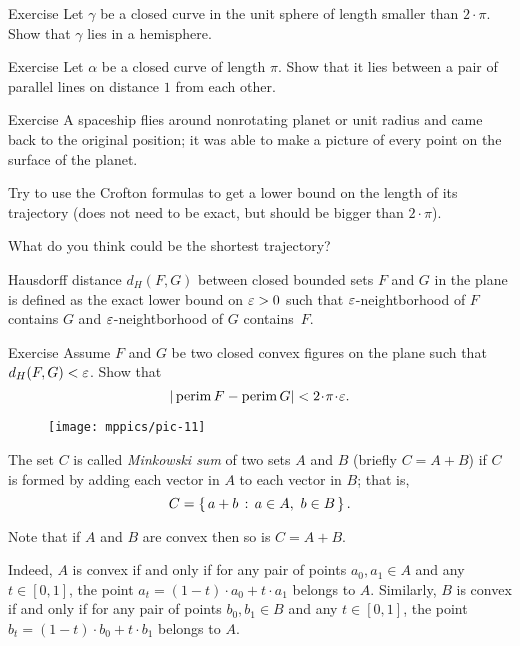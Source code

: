 \begin{thm}{Exercise}\label{ex:2pi-sphere}
Let $\gamma$ be a closed curve in the unit sphere of length smaller than $2\cdot\pi$.
Show that $\gamma$ lies in a hemisphere.
\end{thm}

\begin{thm}{Exercise} 
Let $\alpha$ be a closed curve of length $\pi$.
Show that it lies between a pair of parallel lines on distance $1$ from each other.
\end{thm}

\begin{thm}{Exercise}
A spaceship flies around nonrotating planet or unit radius and came back to the original position;
it was able to make a picture of every point on the surface of the planet.

Try to use the Crofton formulas to get a lower bound on the length of its trajectory (does not need to be exact, but should be bigger than $2\cdot\pi$).

What do you think could be the shortest trajectory?
\end{thm}

Hausdorff distance $d_H(F,G)$ between closed bounded sets $F$ and $G$ in the plane is defined as the exact lower bound on $\varepsilon>0$ such that $\varepsilon$-neightborhood of $F$ contains $G$ and $\varepsilon$-neightborhood of $G$ contains~$F$.

\begin{thm}{Exercise}
Assume $F$ and $G$ be two closed convex figures on the plane such that $d_H(F,G)<\varepsilon$.
Show that 
\[|\perim F-\perim G|<2\cdot\pi\cdot\eps.\]

\end{thm}

\begin{wrapfigure}{r}{33 mm}
\vskip-7mm
\centering
\texttt{[image: mppics/pic-11]}
\vskip0mm
\end{wrapfigure}

The set $C$ is called \emph{Minkowski sum} of two sets $A$ and $B$  (briefly $C=A+B$) if $C$ is formed by adding each vector in $A$ to each vector in $B$;
that is, 
\[C = \left\{\,{a+b}\,:\,{a\in A,\ b\in B}\,\right\}.\]

Note that if $A$ and $B$ are convex then so is $C=A+B$. %

Indeed, $A$ is convex if and only if for any pair of points $a_0,a_1\in A$ and any $t\in[0,1]$,
the point $a_t=(1-t)\cdot a_0+t\cdot a_1$ belongs to $A$.
Similarly, $B$ is convex if and only if for any pair of points $b_0,b_1\in B$ and any $t\in[0,1]$,
the point $b_t=(1-t)\cdot b_0+t\cdot b_1$ belongs to $A$.


